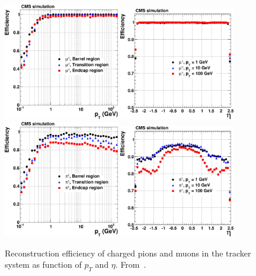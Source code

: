 \begin{figure}[!Hhtbp]
  \begin{center}
    \includegraphics[width=0.45\textwidth]{figs/eff_muon_vs_pt.png}
    \includegraphics[width=0.45\textwidth]{figs/eff_muon_vs_eta.png}
    \includegraphics[width=0.45\textwidth]{figs/eff_pion_vs_pt.png}
    \includegraphics[width=0.45\textwidth]{figs/eff_pion_vs_eta.png}
    \caption{Reconstruction efficiency of charged pions and muons in the tracker system as function of $p_{T}$ and $\eta$. From~\cite{Chatrchyan:2014fea}.}
    \label{fig:TrackerEff}
  \end{center}
\end{figure}

